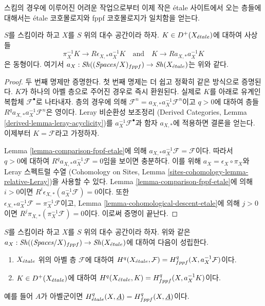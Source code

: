 \noindent
스킴의 경우에 이루어진 어려운 작업으로부터 이제 작은 \'etale
사이트에서 오는 층들에 대해서는 \'etale 코호몰로지와 fppf
코호몰로지가 일치함을 얻는다.

\begin{lemma}
\label{lemma-cohomological-descent-etale-fppf}
$S$를 스킴이라 하고 $X$를 $S$ 위의 대수 공간이라 하자.
$K \in D^+(X_{\acute{e}tale})$에 대하여 사상들
$$
\pi_X^{-1}K \longrightarrow R\epsilon_{X, *}a_X^{-1}K
\quad\text{and}\quad
K \longrightarrow Ra_{X, *}a_X^{-1}K
$$
은 동형이다. 여기서
$a_X : \mathop{\mathit{Sh}}\nolimits((\textit{Spaces}/X)_{fppf}) \to \mathop{\mathit{Sh}}\nolimits(X_{\acute{e}tale})$는 위와 같다.
\end{lemma}

\begin{proof}
두 번째 명제만 증명한다. 첫 번째 명제는 더 쉽고 정확히 같은 방식으로
증명된다. $K$가 하나의 아벨 층으로 주어진 경우로 즉시 환원된다.
실제로 $K$를 아래로 유계인 복합체 $\mathcal{F}^\bullet$로 나타내자.
층의 경우에 의해
$\mathcal{F}^n = a_{X, *} a_X^{-1} \mathcal{F}^n$이고
$q > 0$에 대하여 층들 $R^qa_{X, *}a_X^{-1}\mathcal{F}^n$은 영이다.
Leray 비순환성 보조정리
(Derived Categories, Lemma \ref{derived-lemma-leray-acyclicity})를
$a_X^{-1}\mathcal{F}^\bullet$과 함자 $a_{X, *}$에 적용하면 결론을
얻는다. 이제부터 $K = \mathcal{F}$라고 가정하자.

\medskip\noindent
Lemma \ref{lemma-comparison-fppf-etale}에 의해
$a_{X, *}a_X^{-1}\mathcal{F} = \mathcal{F}$이다. 따라서\\
$q > 0$에 대하여 $R^qa_{X, *}a_X^{-1}\mathcal{F} = 0$임을 보이면
충분하다. 이를 위해
$a_X = \epsilon_X \circ \pi_X$와 Leray 스펙트럴 수열
(Cohomology on Sites, Lemma
\ref{sites-cohomology-lemma-relative-Leray})을 사용할 수 있다.
Lemma \ref{lemma-comparison-fppf-etale}에 의해 $i > 0$이면
$R^i\epsilon_{X, *}(a_X^{-1}\mathcal{F}) = 0$이다. 또한\\
$\epsilon_{X, *}a_X^{-1}\mathcal{F} = \pi_X^{-1}\mathcal{F}$이고,
Lemma \ref{lemma-cohomological-descent-etale}에 의해 $j > 0$이면
$R^j\pi_{X, *}(\pi_X^{-1}\mathcal{F}) = 0$이다.
이로써 증명이 끝난다.
\end{proof}

\begin{lemma}
\label{lemma-compare-cohomology-etale-fppf}
$S$를 스킴이라 하고 $X$를 $S$ 위의 대수 공간이라 하자.
위와 같은 $a_X : \mathop{\mathit{Sh}}\nolimits((\textit{Spaces}/X)_{fppf}) \to \mathop{\mathit{Sh}}\nolimits(X_{\acute{e}tale})$에
대하여 다음이 성립한다.
\begin{enumerate}
\item $X_{\acute{e}tale}$ 위의 아벨 층 $\mathcal{F}$에 대하여
$H^q(X_{\acute{e}tale}, \mathcal{F}) = H^q_{fppf}(X, a_X^{-1}\mathcal{F})$이다.
\item $K \in D^+(X_{\acute{e}tale})$에 대하여
$H^q(X_{\acute{e}tale}, K) = H^q_{fppf}(X, a_X^{-1}K)$이다.
\end{enumerate}
예를 들어 $A$가 아벨군이면
$H^q_{\acute{e}tale}(X, \underline{A}) = H^q_{fppf}(X, \underline{A})$이다.
\end{lemma}

